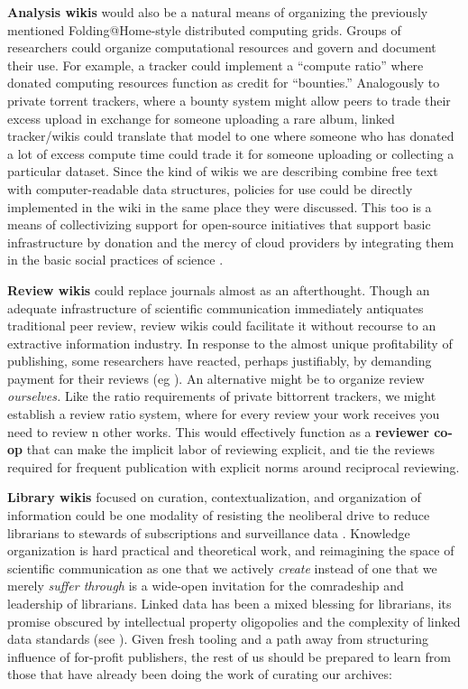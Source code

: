 \textbf{Analysis wikis} would also be a natural means of organizing the
previously mentioned Folding@Home-style distributed computing grids.
Groups of researchers could organize computational resources and govern
and document their use. For example, a tracker could implement a
``compute ratio'' where donated computing resources function as credit
for ``bounties.'' Analogously to private torrent trackers, where a
bounty system might allow peers to trade their excess upload in exchange
for someone uploading a rare album, linked tracker/wikis could translate
that model to one where someone who has donated a lot of excess compute
time could trade it for someone uploading or collecting a particular
dataset. Since the kind of wikis we are describing combine free text
with computer-readable data structures, policies for use could be
directly implemented in the wiki in the same place they were discussed.
This too is a means of collectivizing support for open-source
initiatives that support basic infrastructure by donation and the mercy
of cloud providers by integrating them in the basic social practices of
science \citep{dupreAdvertisingNewInfrastructures2022} .

\textbf{Review wikis} could replace journals almost as an afterthought.
Though an adequate infrastructure of scientific communication
immediately antiquates traditional peer review, review wikis could
facilitate it without recourse to an extractive information industry. In
response to the almost unique profitability of publishing, some
researchers have reacted, perhaps justifiably, by demanding payment for
their reviews (eg \citep{heathers450Movement2020} ). An
alternative might be to organize review \emph{ourselves.} Like the ratio
requirements of private bittorrent trackers, we might establish a review
ratio system, where for every review your work receives you need to
review n other works. This would effectively function as a
\textbf{reviewer co-op} that can make the implicit labor of reviewing
explicit, and tie the reviews required for frequent publication with
explicit norms around reciprocal reviewing.

\textbf{Library wikis} focused on curation, contextualization, and
organization of information could be one modality of resisting the
neoliberal drive to reduce librarians to stewards of subscriptions and
surveillance data \citep{lamdanLibrarianshipCrossroadsICE2019, quinnResistingNeoliberalismChallenge2017} . Knowledge organization is
hard practical and theoretical work, and reimagining the space of
scientific communication as one that we actively \emph{create} instead
of one that we merely \emph{suffer through} is a wide-open invitation
for the comradeship and leadership of librarians. Linked data has been a
mixed blessing for librarians, its promise obscured by intellectual
property oligopolies and the complexity of linked data standards (see
\citep{librariaStoningGoliath2022} ). Given fresh tooling and a
path away from structuring influence of for-profit publishers, the rest
of us should be prepared to learn from those that have already been
doing the work of curating our archives:

